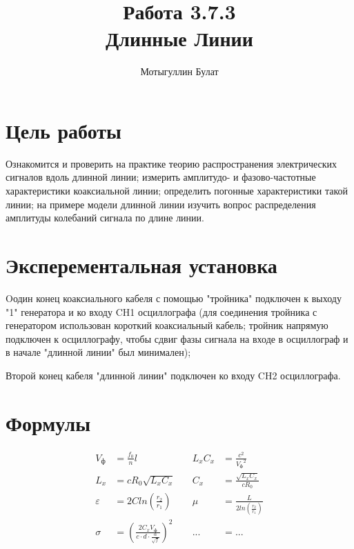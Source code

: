 \documentclass[a4paper, 12pt]{article}%
\author{Мотыгуллин Булат}
\title{\textbf{Работа 3.7.3\\
Длинные Линии}}
\date{}
\begin{document}
\maketitle


\section*{Цель работы}
Ознакомится и проверить на практике теорию распространения
электрических сигналов вдоль длинной линии; измерить амплитудо- и фазово-частотные
характеристики коаксиальной линии; определить погонные характеристики такой
линии; на примере модели длинной линии изучить вопрос распределения амплитуды
колебаний сигнала по длине линии.

\section*{Эксперементальная установка}

Oодин конец коаксиального кабеля с
помощью "тройника" подключен к выходу
"1" генератора и ко входу CH1 осциллографа
(для соединения тройника с генератором
использован короткий коаксиальный кабель;
тройник напрямую подключен к
осциллографу, чтобы сдвиг фазы сигнала на
входе в осциллограф и в начале "длинной
линии" был минимален);

Второй конец кабеля "длинной
линии" подключен ко входу CH2
осциллографа.

\section*{Формулы}

\begin{align*}
    V_{\text{ф}} &= \frac{f_0}{n} l & \quad L_xC_x &= \frac{c^2}{{V_{\text{ф}}}^2} \\
    L_x &= cR_0\sqrt{L_xC_x} & \quad C_x &= \frac{\sqrt{L_xC_x}}{cR_0} \\
   \varepsilon &= 2Cln\left(\frac{r_2}{r_1}\right) & \quad \mu &= \frac{L}{2ln\left(\frac{r_2}{r_1}\right)} \\
    \sigma &= \left( \frac{2C_xV_{\text{ф}}}{c \cdot d \cdot \frac{\alpha}{\sqrt{f}}} \right)^2 & \quad ... &= ...
\end{align*}
\end{document}
